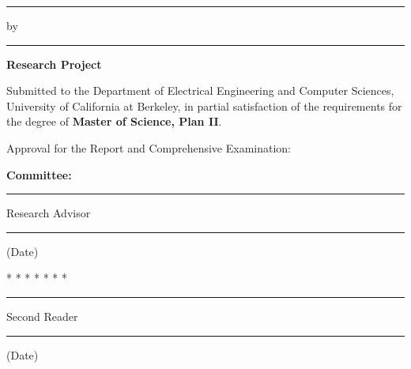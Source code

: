 \makeatletter
\thispagestyle{empty}

\begin{center}
\rule{6.5in}{0.40mm}

\vspace{0.35in}
    {\large \textbf{\@title} }

\vspace{0.25in}
    {\large by \@author }

\vspace{0.35in}
\rule{6.5in}{0.40mm}

\vspace{0.5in}
    {\large {\textbf{Research Project}}}
\end{center}

\noindent Submitted to the Department of Electrical Engineering and
Computer Sciences, University of California at Berkeley,
in partial satisfaction of the requirements for the degree
of \textbf{Master of Science, Plan II}.

\vspace{0.25in}
\noindent Approval for the Report and Comprehensive Examination:

\begin{center}
    \textbf{ Committee:}

\vspace{0.25in}
\rule{3.5in}{0.25mm}

\@chair

Research Advisor

\vspace{0.25in}
\rule{3.5in}{0.25mm}

(Date)

\vspace{0.25in}
* * * * * * *

\vspace{0.25in}
\rule{3.5in}{0.25mm}

\@othermembers

Second Reader

\vspace{0.25in}
\rule{3.5in}{0.25mm}

(Date)
\end{center}
\makeatother

